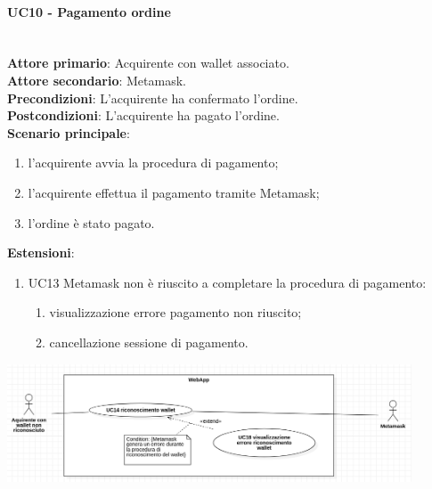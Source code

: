 \documentclass[a4paper, 12pt]{article}
\begin{document}
\paragraph{UC10 - Pagamento ordine}\\
\textbf{Attore primario}: Acquirente con wallet associato.\\
\textbf{Attore secondario}: Metamask.\\
\textbf{Precondizioni}: L'acquirente ha confermato l'ordine.\\
\textbf{Postcondizioni}: L'acquirente ha pagato l'ordine.\\
\textbf{Scenario principale}:
\begin{enumerate}
    \item l'acquirente avvia la procedura di pagamento;
    \item l'acquirente effettua il pagamento tramite Metamask;
    \item l'ordine è stato pagato.
\end{enumerate}
\textbf{Estensioni}:
\begin{enumerate}
    \item UC13 Metamask non è riuscito a completare la procedura di pagamento:
    \begin{enumerate}
        \item visualizzazione errore pagamento non riuscito;
        \item cancellazione sessione di pagamento.
    \end{enumerate}
\end{enumerate}

\includegraphics[width=0.9\textwidth]{UseCase_webapp1}
\end{document}
